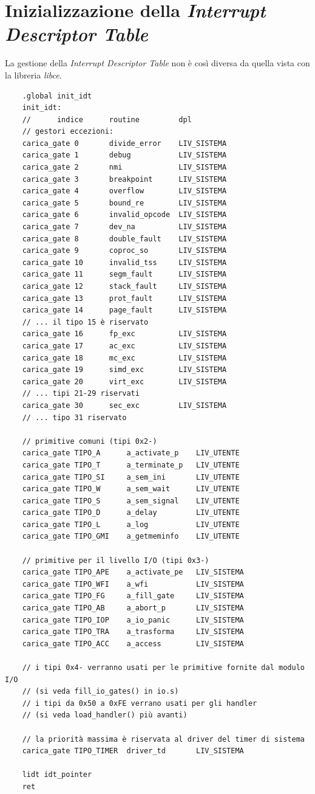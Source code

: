 \section{Inizializzazione della \emph{Interrupt Descriptor Table}}
La gestione della \emph{Interrupt Descriptor Table} non è così diversa da quella vista con la libreria \emph{libce}.
\small 
\begin{verbatim}
	.global init_idt
	init_idt:
	//      indice      routine         dpl
	// gestori eccezioni:
	carica_gate	0       divide_error    LIV_SISTEMA
	carica_gate	1       debug           LIV_SISTEMA
	carica_gate	2       nmi             LIV_SISTEMA
	carica_gate	3       breakpoint      LIV_SISTEMA
	carica_gate	4       overflow        LIV_SISTEMA
	carica_gate	5       bound_re        LIV_SISTEMA
	carica_gate	6       invalid_opcode  LIV_SISTEMA
	carica_gate	7       dev_na          LIV_SISTEMA
	carica_gate	8       double_fault    LIV_SISTEMA
	carica_gate	9       coproc_so       LIV_SISTEMA
	carica_gate	10      invalid_tss     LIV_SISTEMA
	carica_gate	11      segm_fault      LIV_SISTEMA
	carica_gate	12      stack_fault     LIV_SISTEMA
	carica_gate	13      prot_fault      LIV_SISTEMA
	carica_gate	14      page_fault      LIV_SISTEMA
	// ... il tipo 15 è riservato
	carica_gate	16      fp_exc          LIV_SISTEMA
	carica_gate	17      ac_exc          LIV_SISTEMA
	carica_gate	18      mc_exc          LIV_SISTEMA
	carica_gate	19      simd_exc        LIV_SISTEMA
	carica_gate	20      virt_exc        LIV_SISTEMA
	// ... tipi 21-29 riservati
	carica_gate	30      sec_exc         LIV_SISTEMA
	// ... tipo 31 riservato
	
	// primitive comuni (tipi 0x2-)
	carica_gate	TIPO_A      a_activate_p    LIV_UTENTE
	carica_gate	TIPO_T      a_terminate_p   LIV_UTENTE
	carica_gate	TIPO_SI     a_sem_ini       LIV_UTENTE
	carica_gate	TIPO_W      a_sem_wait      LIV_UTENTE
	carica_gate	TIPO_S      a_sem_signal    LIV_UTENTE
	carica_gate	TIPO_D      a_delay         LIV_UTENTE
	carica_gate	TIPO_L      a_log           LIV_UTENTE
	carica_gate	TIPO_GMI    a_getmeminfo    LIV_UTENTE
	
	// primitive per il livello I/O (tipi 0x3-) 
	carica_gate	TIPO_APE    a_activate_pe   LIV_SISTEMA
	carica_gate	TIPO_WFI    a_wfi           LIV_SISTEMA
	carica_gate	TIPO_FG     a_fill_gate     LIV_SISTEMA
	carica_gate	TIPO_AB     a_abort_p       LIV_SISTEMA
	carica_gate	TIPO_IOP    a_io_panic      LIV_SISTEMA
	carica_gate	TIPO_TRA    a_trasforma     LIV_SISTEMA
	carica_gate	TIPO_ACC    a_access        LIV_SISTEMA
	
	// i tipi 0x4- verranno usati per le primitive fornite dal modulo I/O
	// (si veda fill_io_gates() in io.s)
	// i tipi da 0x50 a 0xFE verrano usati per gli handler
	// (si veda load_handler() più avanti)
	
	// la priorità massima è riservata al driver del timer di sistema
	carica_gate	TIPO_TIMER  driver_td       LIV_SISTEMA
	
	lidt idt_pointer
	ret
\end{verbatim}
